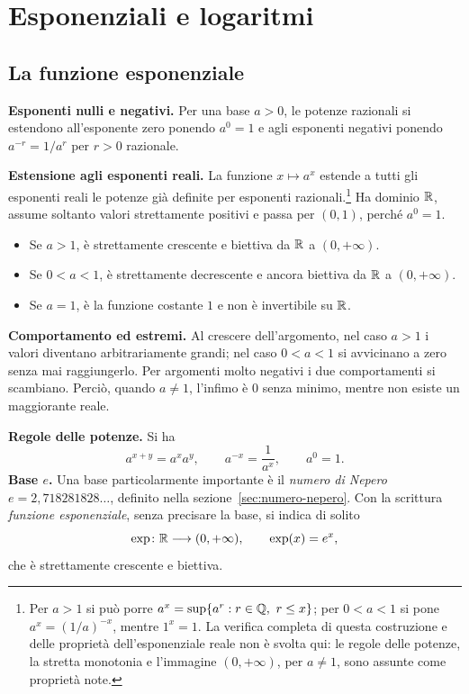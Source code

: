 \section{Esponenziali e logaritmi}
\label{sec:exp-log}

\subsection{La funzione esponenziale}

\textbf{Esponenti nulli e negativi.} Per una base $a>0$, le potenze razionali si estendono all'esponente zero ponendo $a^0=1$ e agli esponenti negativi ponendo $a^{-r}=1/a^r$ per $r>0$ razionale.

\textbf{Estensione agli esponenti reali.} La funzione $x\mapsto a^x$ estende a tutti gli esponenti reali le potenze già definite per esponenti razionali.\footnote{Per $a>1$ si può porre $a^x=\sup\{a^r:r\in\mathbb{Q},\ r\le x\}$; per $0<a<1$ si pone $a^x=(1/a)^{-x}$, mentre $1^x=1$. La verifica completa di questa costruzione e delle proprietà dell'esponenziale reale non è svolta qui: le regole delle potenze, la stretta monotonia e l'immagine $(0,+\infty)$, per $a\ne1$, sono assunte come proprietà note.} Ha dominio $\mathbb{R}$, assume soltanto valori strettamente positivi e passa per $(0,1)$, perché $a^0=1$.
\begin{itemize}
  \item Se $a>1$, è strettamente crescente e biettiva da $\mathbb{R}$ a $(0,+\infty)$.
  \item Se $0<a<1$, è strettamente decrescente e ancora biettiva da $\mathbb{R}$ a $(0,+\infty)$.
  \item Se $a=1$, è la funzione costante $1$ e non è invertibile su $\mathbb{R}$.
\end{itemize}
\textbf{Comportamento ed estremi.} Al crescere dell'argomento, nel caso $a>1$ i valori diventano arbitrariamente grandi; nel caso $0<a<1$ si avvicinano a zero senza mai raggiungerlo. Per argomenti molto negativi i due comportamenti si scambiano. Perciò, quando $a\ne1$, l'infimo è $0$ senza minimo, mentre non esiste un maggiorante reale.

\textbf{Regole delle potenze.} Si ha
\[
a^{x+y}=a^xa^y,\qquad a^{-x}=\frac1{a^x},\qquad a^0=1.
\]
\textbf{Base $e$.} Una base particolarmente importante è il \emph{numero di Nepero} $e=2{,}718281828\ldots$, definito nella sezione~\ref{sec:numero-nepero}. Con la scrittura \emph{funzione esponenziale}, senza precisare la base, si indica di solito
\[
\exp\colon\mathbb{R}\longrightarrow(0,+\infty),\qquad \exp(x)=e^x,
\]
che è strettamente crescente e biettiva.

